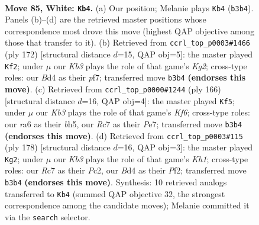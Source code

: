\documentclass[11pt]{article}
\begin{document}
\clearpage

\begin{figure}[p]\centering
\begin{subfigure}{0.46\textwidth}\centering
\resizebox{\linewidth}{!}{%
\newchessgame
\chessboard[
  setfen={5k2/2R5/r7/8/3Bp2p/1K3p1P/5P2/8 w - - 4 85},
  showmover=false,
  pgfstyle=straightmove, color=movearrow, markmove={b3-b4}
]}
\caption{}
\end{subfigure}\hfill
\begin{subfigure}{0.46\textwidth}\centering
\resizebox{\linewidth}{!}{%
\newchessgame
\chessboard[
  setfen={3R4/5pk1/4p3/4P3/5PP1/8/6K1/r7 w - - 89 87},
  showmover=false,
  pgfstyle=straightmove, color=movearrow, markmove={g2-f2}
]}
\caption{}
\end{subfigure}
\\[4pt]
\begin{subfigure}{0.46\textwidth}\centering
\resizebox{\linewidth}{!}{%
\newchessgame
\chessboard[
  setfen={8/4P3/p4K2/Pp1k3b/1P6/3p4/3B4/8 w - - 6 84},
  showmover=false,
  pgfstyle=straightmove, color=movearrow, markmove={f6-f5}
]}
\caption{}
\end{subfigure}\hfill
\begin{subfigure}{0.46\textwidth}\centering
\resizebox{\linewidth}{!}{%
\newchessgame
\chessboard[
  setfen={8/2b5/6Bp/6p1/3k2P1/7P/2P2P2/7K w - - 95 90},
  showmover=false,
  pgfstyle=straightmove, color=movearrow, markmove={h1-g2}
]}
\caption{}
\end{subfigure}
\caption{\textbf{Move 85, White: \texttt{Kb4}.} (a) Our position; Melanie plays \texttt{Kb4} (\texttt{b3b4}). Panels (b)--(d) are the retrieved master positions whose correspondence most drove this move (highest QAP objective among those that transfer to it). (b) Retrieved from \texttt{ccrl\_top\_p0003\#1466} (ply 172) [structural distance $d$=15, QAP obj=5]: the master played \texttt{Kf2}; under $\mu$ our \emph{Kb3} plays the role of that game's \emph{Kg2}; cross-type roles: our \emph{B}d4 as their \emph{p}f7; transferred move \texttt{b3b4} \textbf{(endorses this move)}. (c) Retrieved from \texttt{ccrl\_top\_p0000\#1244} (ply 166) [structural distance $d$=16, QAP obj=4]: the master played \texttt{Kf5}; under $\mu$ our \emph{Kb3} plays the role of that game's \emph{Kf6}; cross-type roles: our \emph{r}a6 as their \emph{b}h5, our \emph{R}c7 as their \emph{P}e7; transferred move \texttt{b3b4} \textbf{(endorses this move)}. (d) Retrieved from \texttt{ccrl\_top\_p0003\#115} (ply 178) [structural distance $d$=16, QAP obj=3]: the master played \texttt{Kg2}; under $\mu$ our \emph{Kb3} plays the role of that game's \emph{Kh1}; cross-type roles: our \emph{R}c7 as their \emph{P}c2, our \emph{B}d4 as their \emph{P}f2; transferred move \texttt{b3b4} \textbf{(endorses this move)}. Synthesis: 10 retrieved analogs transferred to \texttt{Kb4} (summed QAP objective 32, the strongest correspondence among the candidate moves); Melanie committed it via the \texttt{search} selector.}
\label{fig:thought-m168}
\end{figure}
\end{document}
